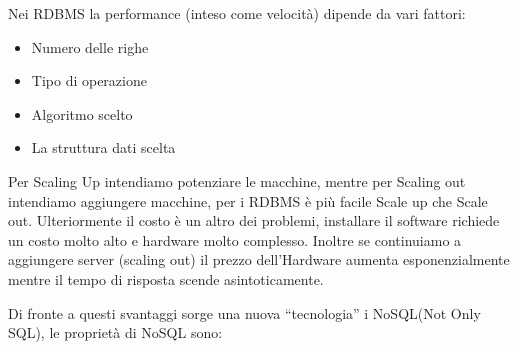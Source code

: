 \documentclass[a4page, 11pt]{article}
\begin{document}
Nei RDBMS la performance (inteso come velocità) dipende da vari fattori:
\begin{itemize}[noitemsep]
	 
	\item
	Numero delle righe
	\item
	Tipo di operazione
	\item
	Algoritmo scelto
	\item
	La struttura dati scelta
\end{itemize}

Per Scaling Up intendiamo potenziare le macchine, mentre per Scaling out
intendiamo aggiungere macchine, per i RDBMS è più facile Scale up che
Scale out. Ulteriormente il costo è un altro dei problemi, installare il
software richiede un costo molto alto e hardware molto complesso.
Inoltre se continuiamo a aggiungere server (scaling out) il prezzo
dell'Hardware aumenta esponenzialmente mentre il tempo di risposta
scende asintoticamente.

Di fronte a questi svantaggi sorge una nuova ``tecnologia'' i NoSQL(Not Only SQL), le proprietà di NoSQL sono:
\end{document}
